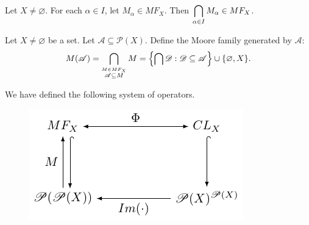 \documentclass{amsart}
\begin{document}

\begin{lemma}
Let \(X \ne \varnothing\).
For each \(\alpha \in I\), let \(M_\alpha \in MF_X\).
Then \(\displaystyle\bigcap_{\alpha \in I} M_\alpha \in MF_X\).
\end{lemma}

\begin{definition}
Let \(X \ne \varnothing\) be a set.
Let \(\mathscr{A} \subseteq \mathscr{P} (X)\).
Define the Moore family generated by \(\mathscr{A}\):
\[
M(\mathscr{A}) = \displaystyle\bigcap_{\stackrel{M \in MF_X}{\mathscr{A} \subseteq M}} M
= \left\{\displaystyle\bigcap \mathscr{D} : \mathscr{D} \subseteq \mathscr{A}\right\} 
\cup \{\varnothing , X\}.
\]
\end{definition}

\begin{remark}
We have defined the following system of operators.
\begin{figure}[hbtp!]
\centering
\includegraphics[width= 0.5 \linewidth, page = 1]{IMAGES/3/3.pdf}
\end{figure}
\end{remark}
\end{document}
